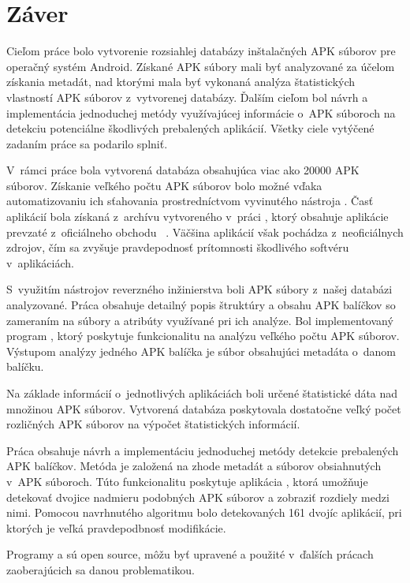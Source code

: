 \chapter{Záver}
Cieľom práce bolo vytvorenie rozsiahlej databázy inštalačných APK súborov pre operačný systém Android. Získané APK súbory mali byť analyzované za účelom získania metadát, nad ktorými mala byť vykonaná analýza štatistických vlastností APK súborov z~vytvorenej databázy. Ďalším cieľom bol návrh a implementácia jednoduchej metódy využívajúcej informácie o~APK súboroch na detekciu potenciálne škodlivých prebalených aplikácií. Všetky ciele vytýčené zadaním práce sa podarilo splniť.

V~rámci práce bola vytvorená databáza obsahujúca viac ako 20000 APK súborov. Získanie veľkého počtu APK súborov bolo možné vďaka automatizovaniu ich sťahovania prostredníctvom vyvinutého nástroja . Časť aplikácií bola získaná z~archívu vytvoreného v~práci , ktorý obsahuje aplikácie prevzaté z~oficiálneho obchodu ~\cite{Viennot2014}. Väčšina aplikácií však pochádza z~neoficiálnych zdrojov, čím sa zvyšuje pravdepodnosť prítomnosti škodlivého softvéru v~aplikáciách. 

S~využitím nástrojov reverzného inžinierstva boli APK súbory z~našej databázi analyzované. Práca obsahuje detailný popis štruktúry a obsahu APK balíčkov so zameraním na súbory a atribúty využívané pri ich analýze. Bol implementovaný program , ktorý poskytuje funkcionalitu na analýzu veľkého počtu APK súborov. Výstupom analýzy jedného APK balíčka je súbor obsahujúci metadáta o~danom balíčku.

Na základe informácií o~jednotlivých aplikáciách boli určené štatistické dáta nad množinou APK súborov. Vytvorená databáza poskytovala dostatočne veľký počet rozličných APK súborov na výpočet štatistických informácií.

Práca obsahuje návrh a implementáciu jednoduchej metódy detekcie prebalených APK balíčkov. Metóda je založená na zhode metadát a súborov obsiahnutých v~APK súboroch. Túto funkcionalitu poskytuje aplikácia , ktorá umožňuje detekovať dvojice nadmieru podobných APK súborov a zobraziť rozdiely medzi nimi. Pomocou navrhnutého algoritmu bolo detekovaných 161 dvojíc aplikácií, pri ktorých je veľká pravdepodbnosť modifikácie.

Programy  a  sú open source, môžu byť upravené a použité v~ďalších prácach zaoberajúcich sa danou problematikou. 